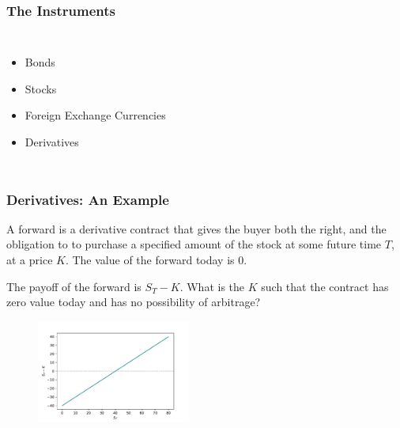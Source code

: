 \documentclass{beamer}
\begin{document}
\begin{frame}
\frametitle{The Instruments}
	
	\begin{columns}[c]	
	
	\begin{itemize}
		\item <1-| alert@1> Bonds
		\item <2-| alert@2> Stocks
		\item <3-| alert@3> Foreign Exchange Currencies
		\item <4-| alert@4> Derivatives
	\end{itemize}
	
	\end{columns}
\end{frame}

\begin{frame}
\frametitle{Derivatives: An Example}

	\begin{definition}[Forward]
		A forward is a derivative contract that gives the buyer both the right, and the obligation to to purchase a specified amount of the stock at some future time $T$, at a price $K$. The value of the forward today is 0.
	\end{definition}
	The payoff of the forward is $S_T - K$. What is the $K$ such that the contract has zero value today and has no possibility of arbitrage?
	
	\begin{figure}
	\includegraphics[width=0.45\textwidth]{../images/foward_payoff}
	\end{figure}
\end{frame}
\end{document}
